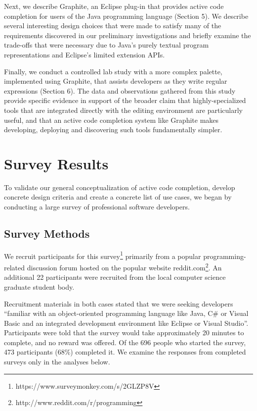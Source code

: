 \documentclass[10pt, conference, compsocconf]{IEEEtran}
\begin{document}
Next, we describe Graphite, an Eclipse plug-in that provides active code completion for users of the Java programming language (Section 5). We describe several interesting design choices that were made to satisfy many of the requirements discovered in our preliminary investigations and briefly examine the trade-offs that were necessary due to Java's purely textual program representations and Eclipse's limited extension APIs.

Finally, we conduct a controlled lab study with a more complex palette, implemented using Graphite, that assists  developers as they write regular expressions (Section 6). The data and observations gathered from this study provide  specific evidence in support of the broader claim that highly-specialized tools that are integrated directly with the editing environment are particularly useful, and that an active code completion system like Graphite makes developing, deploying and discovering such tools fundamentally simpler.

\section{Survey Results}
To validate our general conceptualization of active code completion, develop concrete design criteria and create a concrete list of use cases, we began by conducting a large survey of professional software developers.

\subsection{Survey Methods}
We recruit participants for this survey\footnote{https://www.surveymonkey.com/s/2GLZP8V} primarily from a popular programming-related discussion forum hosted on the popular website reddit.com\footnote{http://www.reddit.com/r/programming}. An additional 22 participants were recruited from the local computer science graduate student body. 

Recruitment materials in both cases stated that we were seeking developers ``familiar with an object-oriented programming language like Java, C\# or Visual Basic and an integrated development environment like Eclipse or Visual Studio''.
Participants were told that the survey would take approximately 20 minutes to complete, and no reward was offered. Of the 696 people who started the survey, 473 participants (68\%) completed it. We examine the responses from completed surveys only in the analyses below.
\end{document}

